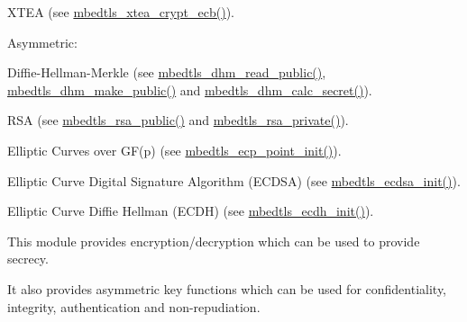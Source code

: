 \begin{DoxyItemize}
\begin{DoxyItemize}
\item X\-T\-E\-A (see {\ttfamily \hyperlink{xtea_8h_a73a0ce1ac62aa079107736ef2aa4b21d}{mbedtls\-\_\-xtea\-\_\-crypt\-\_\-ecb()}}).
\end{DoxyItemize}
\item Asymmetric\-:
\begin{DoxyItemize}
\item Diffie-\/\-Hellman-\/\-Merkle (see {\ttfamily \hyperlink{dhm_8h_a1fe799e776fd0f27eb4080248e547f3d}{mbedtls\-\_\-dhm\-\_\-read\-\_\-public()}}, {\ttfamily \hyperlink{dhm_8h_af49bee438130355e24540f7565e7465f}{mbedtls\-\_\-dhm\-\_\-make\-\_\-public()}} and {\ttfamily \hyperlink{dhm_8h_ac3985de01420d018ed91daec9e7d7969}{mbedtls\-\_\-dhm\-\_\-calc\-\_\-secret()}}).
\item R\-S\-A (see {\ttfamily \hyperlink{rsa_8h_a9db0f76aff9a6ce179b6fbe329bf5569}{mbedtls\-\_\-rsa\-\_\-public()}} and {\ttfamily \hyperlink{rsa_8h_a3e016741ddaa354916ade4d48e9a0965}{mbedtls\-\_\-rsa\-\_\-private()}}).
\item Elliptic Curves over G\-F(p) (see {\ttfamily \hyperlink{ecp_8h_ae069f80bc2f9cf2215c34430a9ccd924}{mbedtls\-\_\-ecp\-\_\-point\-\_\-init()}}).
\item Elliptic Curve Digital Signature Algorithm (E\-C\-D\-S\-A) (see {\ttfamily \hyperlink{ecdsa_8h_aca644ee02921388fdc42eb06377f4b62}{mbedtls\-\_\-ecdsa\-\_\-init()}}).
\item Elliptic Curve Diffie Hellman (E\-C\-D\-H) (see {\ttfamily \hyperlink{ecdh_8h_a97e787a12f7aae180ab9828303199dca}{mbedtls\-\_\-ecdh\-\_\-init()}}).
\end{DoxyItemize}
\end{DoxyItemize}

This module provides encryption/decryption which can be used to provide secrecy.

It also provides asymmetric key functions which can be used for confidentiality, integrity, authentication and non-\/repudiation. 
